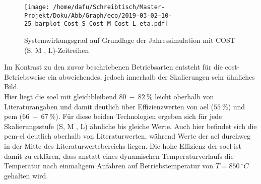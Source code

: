 \documentclass[onecolumn,10pt,titlepage]{article}
\begin{document}
\begin{figure}[H]

	\centering
	\texttt{[image: /home/dafu/Schreibtisch/Master-Projekt/Doku/Abb/Graph/eco/2019-03-02--10-25\_barplot\_Cost\_S\_Cost\_M\_Cost\_L\_eta.pdf]}
	\caption[Systemwirkungsgrad-COST]{Systemwirkungsgrad auf Grundlage der Jahressimulation mit COST (S, M , L)-Zeitreihen  }
	\label{fig:analy_COST_eta}
\end{figure}
Im Kontrast zu den zuvor beschriebenen Betriebsarten entsteht für die \gls{cost}-Betriebsweise ein abweichendes, jedoch innerhalb der Skalierungen sehr ähnliches Bild.\\
Hier liegt die  \gls{soel} mit gleichbleibend $80~-~82~ \%$ leicht oberhalb von Literaturangaben und damit deutlich über Effizienzwerten von \gls{ael} ($55~\%$) und \gls{pem} ($66~-~67~\%$). Für diese beiden Technologien ergeben sich für jede Skalierungsstufe (S, M , L) ähnliche bis gleiche Werte. Auch hier befindet sich die \gls{pem}-\gls{el} deutlich oberhalb von Literaturwerten, während Werte der \gls{ael} durchweg in der Mitte des Literaturwertebereichs liegen.
Die hohe Effizienz der \gls{soel} ist damit zu erklären, dass anstatt eines dynamischen Temperaturverlaufs die Temperatur nach einmaligem Anfahren auf Betriebstemperatur von $T=850~^\circ C$ gehalten wird.
\end{document}
